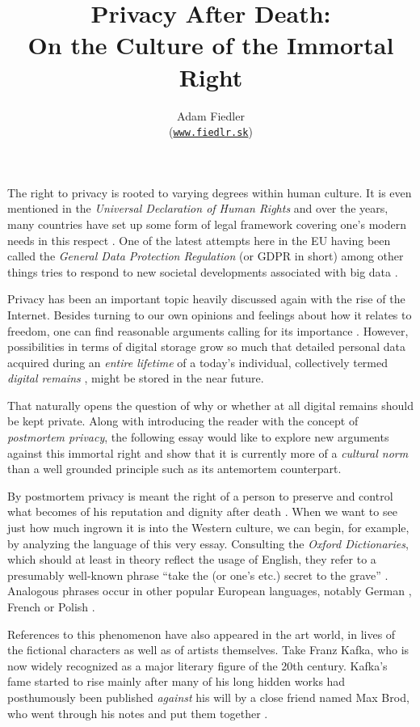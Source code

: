 \documentclass[a4paper]{article}
\title{
    Privacy After Death:\\
    On the Culture of the Immortal Right
}
\author{
    Adam Fiedler\\
    \small
    (\texttt{\href{http://fiedlr.sk}{www.fiedlr.sk}})
}
\date{}
\begin{document}
\maketitle

The right to privacy is rooted to varying degrees within human culture. It is even mentioned in the \textit{Universal Declaration of Human Rights} \cite{udrights} and over the years, many countries have set up some form of legal framework covering one's modern needs in this respect \cite{consumerreport}. One of the latest attempts here in the EU having been called the \textit{General Data Protection Regulation} (or GDPR in short) among other things tries to respond to new societal developments associated with big data \cite{louveaux}.

Privacy has been an important topic heavily discussed again with the rise of the Internet. Besides turning to our own opinions and feelings about how it relates to freedom, one can find reasonable arguments calling for its importance \cite{harbinja2}. 
However, possibilities in terms of digital storage grow so much that detailed personal data acquired during an \emph{entire lifetime} of a today's individual, collectively termed \textit{digital remains} \cite{buitelaar}, might be stored in the near future. 

That naturally opens the question of why or whether at all digital remains should be kept private. Along with introducing the reader with the concept of \textit{postmortem privacy}, the following essay would like to explore new arguments against this immortal right and show that it is currently more of a \emph{cultural norm} than a well grounded principle such as its antemortem counterpart.

\medskip
By postmortem privacy is meant the right of a person to preserve and control what becomes of his reputation and dignity after death \cite{harbinja2, buitelaar}. When we want to see just how much ingrown it is into the Western culture, we can begin, for example, by analyzing the language of this very essay. Consulting the \textit{Oxford Dictionaries}, which should at least in theory reflect the usage of English, they refer to a presumably well-known phrase ``take the (or one's etc.) secret to the grave'' \cite{oxford}. Analogous phrases occur in other popular European languages, notably German \cite{duden}, French \cite{larousse} or Polish \cite{wsjp}.

References to this phenomenon have also appeared in the art world, in lives of the fictional characters as well as of artists themselves. Take Franz Kafka, who is now widely recognized as a major literary figure of the 20th century. 
Kafka's fame started to rise mainly after many of his long hidden works had posthumously been published \emph{against} his will by a close friend named Max Brod, who went through his notes and put them together \cite{kafka, brod}.
\end{document}
